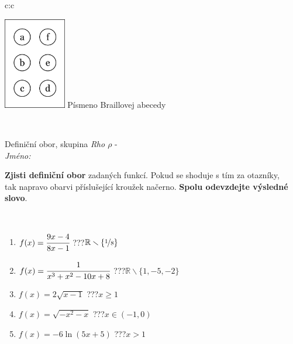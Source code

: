 \documentclass[10pt]{report}
\begin{document}
\begin{tabular}{c:c}
\begin{minipage}[c][104.5mm][t]{0.5\linewidth}
\begin{center}
\begin{minipage}{0.20\linewidth}
\begin{center}
\includegraphics[height=40mm]{../images/braille.png}
{\small Písmeno Braillovej abecedy}
\end{center}
\end{minipage}
\end{center}
\end{minipage}
\\ \hdashline
\begin{minipage}[c][104.5mm][t]{0.5\linewidth}
\begin{center}
\vspace{7mm}
{\huge Definiční obor, skupina \textit{Rho $\rho$} -}\\[5mm]
\textit{Jméno:}\phantom{xxxxxxxxxxxxxxxxxxxxxxxxxxxxxxxxxxxxxxxxxxxxxxxxxxxxxxxxxxxxxxxxx}\\[5mm]
\begin{minipage}{0.95\linewidth}
\begin{center}
\textbf{Zjisti definiční obor} zadaných funkcí. Pokud se shoduje s tím za otazníky,\\tak napravo obarvi příslušející kroužek načerno. \textbf{Spolu odevzdejte výsledné slovo}.
\end{center}
\end{minipage}
\\[1mm]
\begin{minipage}{0.79\linewidth}
\begin{center}
\begin{varwidth}{\linewidth}
\begin{enumerate}
\normalsizerrr
\item $f(x)=\cfrac{9x-4}{8x-1}$\quad \dotfill\; ???\;\dotfill \quad $\mathbb{R}\smallsetminus\{\nicefrac{1}{8}\}$
\item $f(x)=\cfrac{1}{x^3+x^2-10x+8}$\quad \dotfill\; ???\;\dotfill \quad $\mathbb{R}\smallsetminus\{1,-5,-2\}$
\item $f(x)=2\sqrt{x-1}$\quad \dotfill\; ???\;\dotfill \quad $x\geq1$
\item $f(x)=\sqrt{-x^2-x}$\quad \dotfill\; ???\;\dotfill \quad $x\in(-1 , 0)$
\item $f(x)=-6\ln{(5x+5)}$\quad \dotfill\; ???\;\dotfill \quad $x>1$

\end{enumerate}
\end{varwidth}
\end{center}
\end{minipage}
\end{center}
\end{minipage}
\end{tabular}
\end{document}

